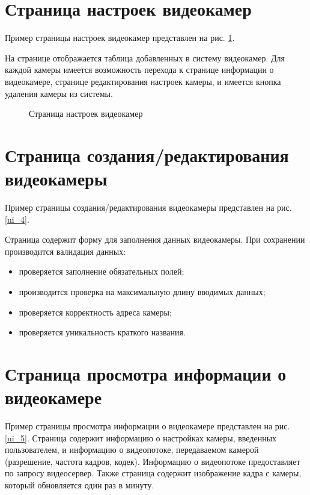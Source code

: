 \section{Страница настроек видеокамер}
Пример страницы настроек видеокамер представлен на рис. \ref{ui_6}.

На странице отображается таблица добавленных в систему видеокамер.
Для каждой камеры имеется возможность перехода к странице информации о видеокамере,
странице редактирования настроек камеры, и имеется кнопка удаления камеры из системы.

\begin{figure}[!htb]
\def\svgwidth{\columnwidth}
\caption{Страница настроек видеокамер}
\label{ui_6}
\end{figure}

\section{Страница создания/редактирования видеокамеры}
Пример страницы создания/редактирования видеокамеры представлен на рис. \ref{ui_4}.

Страница содержит форму для заполнения данных видеокамеры.
При сохранении производится валидация данных:
\smallskip
\begin{itemize}
\item проверяется заполнение обязательных полей;
\item производится проверка на максимальную длину вводимых данных;
\item проверяется корректность адреса камеры;
\item проверяется уникальность краткого названия.
\end{itemize}

\section{Страница просмотра информации о видеокамере}
Пример страницы просмотра информации о видеокамере представлен на рис. \ref{ui_5}.
Страница содержит информацию о настройках камеры, введенных пользователем, и информацию
о видеопотоке, передаваемом камерой (разрешение, частота кадров, кодек).
Информацию о видеопотоке предоставляет по запросу видеосервер.
Также страница содержит изображение кадра с камеры, который обновляется один раз в минуту.

